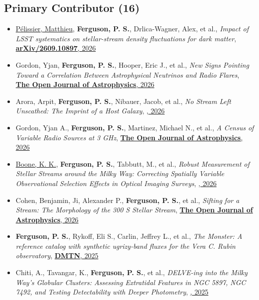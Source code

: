 \renewcommand{\labelitemi}{$$}
\subsection{Primary Contributor  (16)}
\begin{itemize}[itemsep=1pt]
    \item \underline{{P{\'e}lissier}, Matthieu}, \textbf{Ferguson, P. S.}, {Drlica-Wagner}, Alex, et al., \textit{{Impact of LSST systematics on stellar-stream density fluctuations for dark matter}}, \href{https://ui.adsabs.harvard.edu/abs/2026arXiv260910897P}{\textbf{arXiv/2609.10897}, 2026}
    \item {Gordon}, Yjan, \textbf{Ferguson, P. S.}, {Hooper}, Eric J., et al., \textit{{New Signs Pointing Toward a Correlation Between Astrophysical Neutrinos and Radio Flares}}, \href{https://ui.adsabs.harvard.edu/abs/2026OJAp....972273G}{\textbf{The Open Journal of Astrophysics}, 2026}
    \item {Arora}, Arpit, \textbf{Ferguson, P. S.}, {Nibauer}, Jacob, et al., \textit{{No Stream Left Unscathed: The Imprint of a Host Galaxy}}, \href{https://ui.adsabs.harvard.edu/abs/2026ApJ..1008...91A}{\textbf{\apj}, 2026}
    \item {Gordon}, Yjan A., \textbf{Ferguson, P. S.}, {Martinez}, Michael N., et al., \textit{{A Census of Variable Radio Sources at 3 GHz}}, \href{https://ui.adsabs.harvard.edu/abs/2026OJAp....962407G}{\textbf{The Open Journal of Astrophysics}, 2026}
    \item \underline{{Boone}, K. K.}, \textbf{Ferguson, P. S.}, {Tabbutt}, M., et al., \textit{{Robust Measurement of Stellar Streams around the Milky Way: Correcting Spatially Variable Observational Selection Effects in Optical Imaging Surveys}}, \href{https://ui.adsabs.harvard.edu/abs/2026ApJ..1001..208B}{\textbf{\apj}, 2026}
    \item {Cohen}, Benjamin, {Ji}, Alexander P., \textbf{Ferguson, P. S.}, et al., \textit{{Sifting for a Stream: The Morphology of the 300 S Stellar Stream}}, \href{https://ui.adsabs.harvard.edu/abs/2026OJAp....961089C}{\textbf{The Open Journal of Astrophysics}, 2026}
    \item \textbf{Ferguson, P. S.}, {Rykoff}, Eli S., {Carlin}, Jeffrey L., et al., \textit{The Monster: A reference catalog with synthetic ugrizy-band fluxes for the Vera C. Rubin observatory}, \href{https://doi.org/10.71929/rubin/2583688}{\textbf{DMTN}, 2025}
    \item {Chiti}, A., {Tavangar}, K., \textbf{Ferguson, P. S.}, et al., \textit{{DELVE-ing into the Milky Way's Globular Clusters: Assessing Extratidal Features in NGC 5897, NGC 7492, and Testing Detectability with Deeper Photometry}}, \href{https://ui.adsabs.harvard.edu/abs/2025AJ....170..294C}{\textbf{\aj}, 2025}

\end{itemize}
